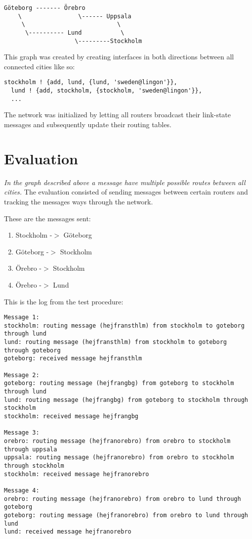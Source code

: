 \documentclass[a4paper, 11pt]{article}
\begin{document}
\begin{verbatim}
Göteborg ------- Örebro
    \                \------ Uppsala
     \                          \
      \---------- Lund           \
                    \---------Stockholm
\end{verbatim}

This graph was created by creating interfaces in both directions between all connected cities like so:
\begin{verbatim}
stockholm ! {add, lund, {lund, 'sweden@lingon'}},
  lund ! {add, stockholm, {stockholm, 'sweden@lingon'}},
  ...
\end{verbatim}

The network was initialized by letting all routers broadcast their link-state messages and subsequently update their routing
 tables.

\section{Evaluation}

\textit{In the graph described above a message have multiple possible routes between all cities.}
The evaluation consisted of sending messages between certain routers and tracking the messages ways through the network.

These are the messages sent:
\begin{enumerate}
  \item Stockholm -$>$ Göteborg
  \item Göteborg -$>$ Stockholm
  \item Örebro -$>$ Stockholm
  \item Örebro -$>$ Lund
\end{enumerate}

This is the log from the test procedure:

\begin{tiny}
\begin{verbatim}
Message 1:
stockholm: routing message (hejfransthlm) from stockholm to goteborg through lund
lund: routing message (hejfransthlm) from stockholm to goteborg through goteborg
goteborg: received message hejfransthlm

Message 2:
goteborg: routing message (hejfrangbg) from goteborg to stockholm through lund
lund: routing message (hejfrangbg) from goteborg to stockholm through stockholm
stockholm: received message hejfrangbg

Message 3:
orebro: routing message (hejfranorebro) from orebro to stockholm through uppsala
uppsala: routing message (hejfranorebro) from orebro to stockholm through stockholm
stockholm: received message hejfranorebro

Message 4:
orebro: routing message (hejfranorebro) from orebro to lund through goteborg
goteborg: routing message (hejfranorebro) from orebro to lund through lund
lund: received message hejfranorebro
\end{verbatim}
\end{tiny}
\end{document}

